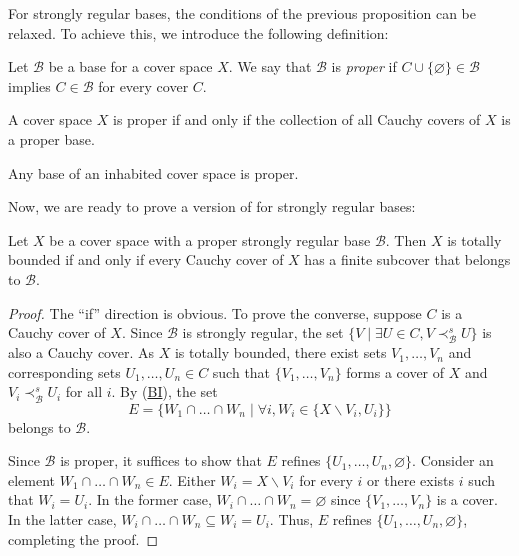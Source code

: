\documentclass[pdflatex,sn-mathphys-num]{sn-jnl}
\newcommand{\axref}[1]{(\hyperref[ax:#1]{#1})}
\theoremstyle{definition}
\theoremstyle{remark}
\numberwithin{figure}{section}
\newcommand{\rb}{\prec}
\begin{document}
For strongly regular bases, the conditions of the previous proposition can be relaxed.
To achieve this, we introduce the following definition:

\begin{defn}
Let $\mathcal{B}$ be a base for a cover space $X$.
We say that $\mathcal{B}$ is \emph{proper} if $C \cup \{ \varnothing \} \in \mathcal{B}$ implies $C \in \mathcal{B}$ for every cover $C$.
\end{defn}

\begin{example}
A cover space $X$ is proper if and only if the collection of all Cauchy covers of $X$ is a proper base.
\end{example}

\begin{example}
Any base of an inhabited cover space is proper.
\end{example}

Now, we are ready to prove a version of  for strongly regular bases:

\begin{prop}
Let $X$ be a cover space with a proper strongly regular base $\mathcal{B}$.
Then $X$ is totally bounded if and only if every Cauchy cover of $X$ has a finite subcover that belongs to $\mathcal{B}$.
\end{prop}
\begin{proof}
The ``if'' direction is obvious.
To prove the converse, suppose $C$ is a Cauchy cover of $X$.
Since $\mathcal{B}$ is strongly regular, the set $\{ V \mid \exists U \in C, V \rb^s_\mathcal{B} U \}$ is also a Cauchy cover.
As $X$ is totally bounded, there exist sets $V_1, \ldots, V_n$ and corresponding sets $U_1, \ldots, U_n \in C$ such that $\{ V_1, \ldots, V_n \}$ forms a cover of $X$ and $V_i \rb^s_\mathcal{B} U_i$ for all $i$.
By \axref{BI}, the set
\[ E = \{ W_1 \cap \ldots \cap W_n \mid \forall i, W_i \in \{ X \backslash V_i, U_i \} \} \]
belongs to $\mathcal{B}$.

Since $\mathcal{B}$ is proper, it suffices to show that $E$ refines $\{ U_1, \ldots, U_n, \varnothing \}$.
Consider an element $W_1 \cap \ldots \cap W_n \in E$.
Either $W_i = X \backslash V_i$ for every $i$ or there exists $i$ such that $W_i = U_i$.
In the former case, $W_i \cap \ldots \cap W_n = \varnothing$ since $\{ V_1, \ldots, V_n \}$ is a cover.
In the latter case, $W_i \cap \ldots \cap W_n \subseteq W_i = U_i$.
Thus, $E$ refines $\{ U_1, \ldots, U_n, \varnothing \}$, completing the proof.
\end{proof}
\end{document}
